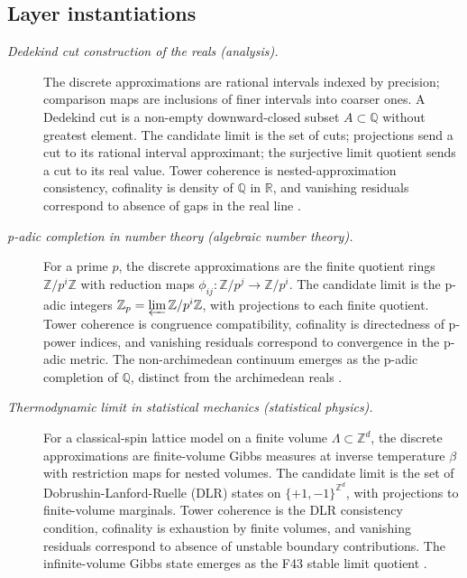 \documentclass[11pt]{article}
\theoremstyle{definition}
\begin{document}
\subsection*{Layer instantiations}\label{layer-inst:F43}

\begin{description}
\item[\emph{Dedekind cut construction of the reals
(analysis).}]
The discrete approximations are rational intervals
indexed by precision; comparison maps are
inclusions of finer intervals into coarser ones.
A Dedekind cut is a non-empty downward-closed
subset \(A\subset\mathbb Q\) without greatest
element.  The candidate limit is the set of cuts;
projections send a cut to its rational interval
approximant; the surjective limit quotient sends
a cut to its real value.  Tower coherence is
nested-approximation consistency, cofinality is
density of \(\mathbb Q\) in \(\mathbb R\), and
vanishing residuals correspond to absence of
gaps in the real line \citep{Dedekind1872Stetigkeit}.

\item[\emph{p-adic completion in number theory
(algebraic number theory).}]
For a prime \(p\), the discrete approximations are
the finite quotient rings \(\mathbb Z/p^i\mathbb Z\)
with reduction maps
\(\phi_{ij}:\mathbb Z/p^j\to\mathbb Z/p^i\).  The
candidate limit is the p-adic integers
\(\mathbb Z_p=\varprojlim\mathbb Z/p^i\mathbb Z\),
with projections to each finite quotient.  Tower
coherence is congruence compatibility, cofinality
is directedness of p-power indices, and vanishing
residuals correspond to convergence in the p-adic
metric.  The non-archimedean continuum emerges as
the p-adic completion of \(\mathbb Q\),
distinct from the archimedean reals
\citep{Hensel1908Theorie}.

\item[\emph{Thermodynamic limit in statistical
mechanics (statistical physics).}]
For a classical-spin lattice model on a finite
volume \(\Lambda\subset\mathbb Z^d\), the discrete
approximations are finite-volume Gibbs measures
at inverse temperature \(\beta\) with restriction
maps for nested volumes.  The candidate limit is
the set of Dobrushin-Lanford-Ruelle (DLR) states
on \(\{+1,-1\}^{\mathbb Z^d}\), with projections
to finite-volume marginals.  Tower coherence is
the DLR consistency condition, cofinality is
exhaustion by finite volumes, and vanishing
residuals correspond to absence of unstable
boundary contributions.  The infinite-volume Gibbs
state emerges as the F43 stable limit quotient
\citep{Ruelle1969StatisticalMechanics}.


\end{description}
\end{document}
